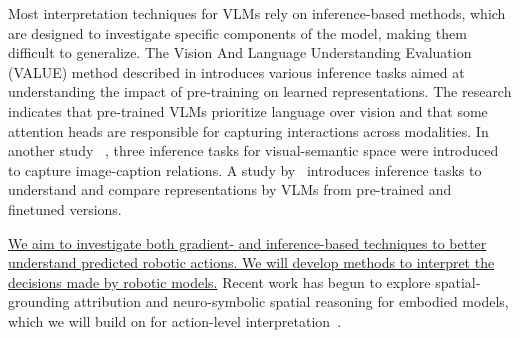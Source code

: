 Most interpretation techniques for VLMs rely on inference-based methods, which are designed to investigate specific components of the model, making them difficult to generalize. 
The Vision And Language Understanding Evaluation (VALUE) method described in \cite{cao2020behind} introduces various inference tasks aimed at understanding the impact of pre-training on learned representations.
The research indicates that pre-trained VLMs prioritize language over vision and that some attention heads are responsible for capturing interactions across modalities.
In another study~
\cite{dahlgren-lindstrom-etal-2020-probing}, three inference tasks for visual-semantic space were introduced to capture image-caption relations.
A study by~\cite{DBLP:conf/aaai/SalinFAF22} introduces inference tasks to understand and compare representations by VLMs from pre-trained and finetuned versions. 




\ul{We aim to investigate both gradient- and inference-based techniques to better understand predicted robotic actions. We will develop methods to interpret the decisions made by robotic models.}
Recent work has begun to explore spatial-grounding attribution and neuro-symbolic spatial reasoning for embodied models, which we will build on for action-level interpretation~\cite{schofield2026chain,jahangard2025multimodal}.

% 